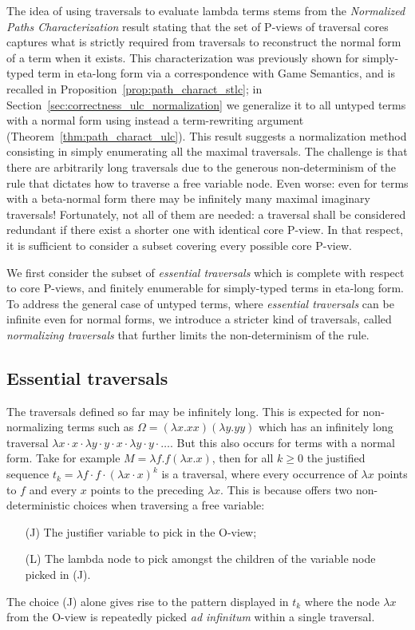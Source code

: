 \documentclass{elsarticle}
\theoremstyle{plain}
\theoremstyle{definition}
\theoremstyle{remark}
\begin{document}
The idea of using traversals to evaluate lambda terms stems from the \emph{Normalized Paths Characterization} result stating that the set of P-views of traversal cores captures what is strictly required from traversals to reconstruct the normal form of a term when it exists.
This characterization was previously shown for simply-typed term in eta-long form via
a correspondence with Game Semantics,
 and is recalled in Proposition~\ref{prop:path_charact_stlc};
 in Section~\ref{sec:correctness_ulc_normalization} we generalize it to all untyped terms with a normal form using instead a term-rewriting argument (Theorem~\ref{thm:path_charact_ulc}).
This result suggests a normalization method consisting in simply enumerating all the maximal traversals.
The challenge is that there are arbitrarily long traversals due to the generous non-determinism of the rule  that dictates how to traverse a free variable node.
Even worse: even for terms with a beta-normal form
there may be infinitely many maximal imaginary traversals!
Fortunately, not all of them are needed: a traversal shall be considered redundant if there exist a shorter one with identical core P-view.
In that respect, it is sufficient to consider a subset covering every possible core P-view.

We first consider the subset of \emph{essential traversals} which is complete with respect to core P-views, and finitely enumerable for simply-typed terms in eta-long form.
To address the general case of untyped terms,
where \emph{essential traversals} can be infinite even for normal forms, we introduce a stricter kind of traversals, called \emph{normalizing traversals} that further limits the non-determinism of the  rule.

\subsection{Essential traversals}

The traversals defined so far may be infinitely long. This is expected for non-normalizing terms such as $\Omega = (\lambda x. x x)(\lambda y. y y)$ which has an infinitely long traversal $\lambda x \cdot x \cdot \lambda y \cdot y \cdot x \cdot \lambda y \cdot y \cdot \ldots$. But this also occurs for terms with a normal form. Take for example $M = \lambda f . f (\lambda x. x)$, then for all $k\geq0$ the justified sequence $t_k = \lambda f \cdot f \cdot (\lambda x \cdot  x)^k$ is a traversal, where every occurrence of $\lambda x$ points to $f$ and every $x$ points to the preceding $\lambda x$.
This is because  offers two non-deterministic choices when traversing a free variable:
\begin{itemize}
\item[(J)] The justifier variable to pick in the O-view;
\item[(L)] The lambda node to pick amongst the children of the variable node picked in (J).
\end{itemize}
The choice (J) alone gives rise to the pattern displayed in $t_k$ where the node $\lambda x$ from the O-view is repeatedly picked {\it ad infinitum} within a single traversal.
\end{document}
